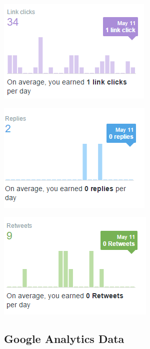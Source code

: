 \centering
\includegraphics[width=0.7\linewidth]{figures/twitter_analytics/linkclicks}
\label{fig:linkclicks}

\centering
\includegraphics[width=0.7\linewidth]{figures/twitter_analytics/replies}
\label{fig:replies}

\centering
\includegraphics[width=0.7\linewidth]{figures/twitter_analytics/retweets}
\label{fig:retweets}




\subsection{Google Analytics Data}

